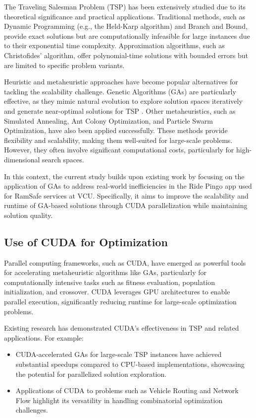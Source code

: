 \documentclass[conference]{IEEEtran}
\begin{document}
The Traveling Salesman Problem (TSP) has been extensively studied due to its theoretical significance and practical applications. Traditional methods, such as Dynamic Programming (e.g., the Held-Karp algorithm\cite{bellman1962dynamic, held1962dynamic}) and Branch and Bound\cite{land2010automatic}, provide exact solutions but are computationally infeasible for large instances due to their exponential time complexity. Approximation algorithms, such as Christofides’ algorithm, offer polynomial-time solutions with bounded errors but are limited to specific problem variants\cite{christofides2022worst}.

Heuristic and metaheuristic approaches have become popular alternatives for tackling the scalability challenge. Genetic Algorithms (GAs) are particularly effective, as they mimic natural evolution to explore solution spaces iteratively and generate near-optimal solutions for TSP \cite{grefenstette2014genetic}. Other metaheuristics, such as Simulated Annealing, Ant Colony Optimization, and Particle Swarm Optimization, have also been applied successfully. These methods provide flexibility and scalability, making them well-suited for large-scale problems. However, they often involve significant computational costs, particularly for high-dimensional search spaces\cite{altenberg1995schema}.

In this context, the current study builds upon existing work by focusing on the application of GAs to address real-world inefficiencies in the Ride Pingo app used for RamSafe services at VCU. Specifically, it aims to improve the scalability and runtime of GA-based solutions through CUDA parallelization while maintaining solution quality.

\subsection{Use of CUDA for Optimization}

Parallel computing frameworks, such as CUDA, have emerged as powerful tools for accelerating metaheuristic algorithms like GAs, particularly for computationally intensive tasks such as fitness evaluation, population initialization, and crossover. CUDA leverages GPU architectures to enable parallel execution, significantly reducing runtime for large-scale optimization problems.

Existing research has demonstrated CUDA’s effectiveness in TSP and related applications. For example:
    \begin{itemize}
        \item CUDA-accelerated GAs for large-scale TSP instances have achieved substantial speedups compared to CPU-based implementations, showcasing the potential for parallelized solution exploration\cite{chen2011cuda, fujimoto2011highly}.
        \item Applications of CUDA to problems such as Vehicle Routing and Network Flow highlight its versatility in handling combinatorial optimization challenges\cite{abbasi2020efficient}.
    \end{itemize}
\end{document}
